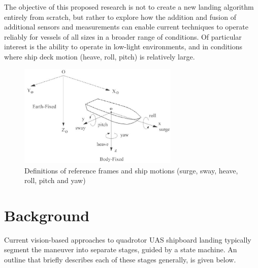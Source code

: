 \documentclass[12pt, letterpaper]{article}
\begin{document}

The objective of this proposed research is not to create a new landing algorithm entirely from scratch, but rather to explore how the addition and fusion of additional sensors and measurements can enable current techniques to operate reliably for vessels of all sizes in a broader range of conditions.  Of particular interest is the ability to operate in low-light environments, and in conditions where ship deck motion (heave, roll, pitch) is relatively large.

\begin{figure}[h] %
   \centering
   \includegraphics[trim = 0mm 0mm 0mm 0mm,clip,width=3in]{ship_motions.png}
   \caption{Definitions of reference frames and ship motions (surge, sway, heave, roll, pitch and yaw)}
   \label{fig:shipmotions}
\end{figure}

\section{Background}


Current vision-based approaches to quadrotor UAS shipboard landing typically segment the maneuver into separate stages, guided by a state machine.  An outline that briefly describes each of these stages generally, is given below.   
\end{document}
